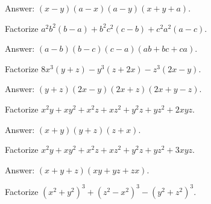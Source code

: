 \begin{solution}[name=Solution by Parviz Shahriari]
Answer: $(x-y)(a-x)(a-y)(x+y+a)$.
\end{solution}


\begin{tcolorbox}
\begin{question}
Factorize $a^2b^2(b-a) + b^2c^2(c-b) + c^2a^2(a-c)$.
\end{question}
\end{tcolorbox}

\begin{solution}[name=Solution by Parviz Shahriari]
Answer: $(a-b)(b-c)(c-a)(ab+bc+ca)$.
\end{solution}


\begin{tcolorbox}
\begin{question}
Factorize $8x^3(y+z)-y^3(z+2x)-z^3(2x-y)$.
\end{question}
\end{tcolorbox}

\begin{solution}[name=Solution by Parviz Shahriari]
Answer: $(y+z)(2x-y)(2x+z)(2x+y-z)$.
\end{solution}


\begin{tcolorbox}
\begin{question}
Factorize $x^2y+xy^2+x^2z+xz^2+y^2z+yz^2+2xyz$.
\end{question}
\end{tcolorbox}

\begin{solution}[name=Solution by Parviz Shahriari]
Answer: $(x+y)(y+z)(z+x)$.
\end{solution}


\begin{tcolorbox}
\begin{question}
Factorize $x^2y+xy^2+x^2z+xz^2+y^2z+yz^2+3xyz$.
\end{question}
\end{tcolorbox}

\begin{solution}[name=Solution by Parviz Shahriari]
Answer: $(x+y+z)(xy+yz+zx)$.
\end{solution}

\begin{tcolorbox}
\begin{question}
Factorize $(x^2+y^2)^3+(z^2-x^2)^3-(y^2+z^2)^3$.
\end{question}
\end{tcolorbox}

